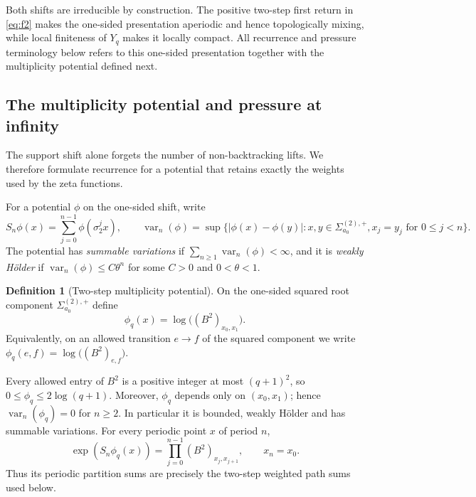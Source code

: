 \documentclass[11pt,reqno]{amsart}
\numberwithin{equation}{section}
\theoremstyle{definition}
\newtheorem{definition}[theorem]{Definition}
\theoremstyle{remark}
\begin{document}
Both shifts are irreducible by construction.  The positive two-step first
return in \cref{eq:f2} makes the one-sided presentation aperiodic and hence
topologically mixing, while local finiteness of $Y_q$ makes it locally compact.
All recurrence and pressure terminology below refers to this one-sided
presentation together with the multiplicity potential defined next.

\subsection{The multiplicity potential and pressure at infinity}
\label{sec:weighted-thermo-definitions}

The support shift alone forgets the number of non-backtracking lifts.  We
therefore formulate recurrence for a potential that retains exactly the
weights used by the zeta functions.

For a potential $\phi$ on the one-sided shift, write
\begin{equation}\label{eq:birkhoff-variation-conventions}
 S_n\phi(x)=\sum_{j=0}^{n-1}\phi(\sigma_2^j x),
 \qquad
 \operatorname{var}_n(\phi)=
 \sup\bigl\{|\phi(x)-\phi(y)|:x,y\in\Sigma^{(2),+}_{a_0},
 x_j=y_j\text{ for }0\le j<n\bigr\}.
\end{equation}
The potential has \emph{summable variations} if
$\sum_{n\ge1}\operatorname{var}_n(\phi)<\infty$, and it is \emph{weakly
H\"older} if $\operatorname{var}_n(\phi)\le C\theta^n$ for some $C>0$ and
$0<\theta<1$.

\begin{definition}[Two-step multiplicity potential]
\label{def:multiplicity-potential}
On the one-sided squared root component $\Sigma^{(2),+}_{a_0}$ define
\begin{equation}\label{eq:multiplicity-potential}
 \phi_q(x)=\log\!\bigl((B^2)_{x_0,x_1}\bigr).
\end{equation}
Equivalently, on an allowed transition $e\to f$ of the squared component we
write $\phi_q(e,f)=\log\!\bigl((B^2)_{e,f}\bigr)$.
\end{definition}

Every allowed entry of
$B^2$ is a positive integer at most $(q+1)^2$, so
$0\le\phi_q\le2\log(q+1)$.  Moreover, $\phi_q$ depends only on $(x_0,x_1)$;
hence $\operatorname{var}_n(\phi_q)=0$ for $n\ge2$.  In particular it is
bounded, weakly H\"older and has summable variations.  For every periodic
point $x$ of
period $n$,
\begin{equation}\label{eq:weighted-periodic-potential}
 \exp(S_n\phi_q(x))
 =\prod_{j=0}^{n-1}(B^2)_{x_j,x_{j+1}},
 \qquad x_n=x_0.
\end{equation}
Thus its periodic partition sums are precisely the two-step weighted path
sums used below.
\end{document}
